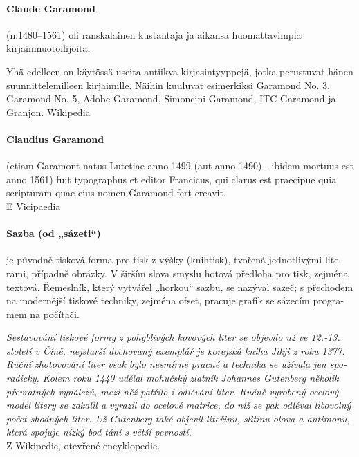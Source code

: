 \documentclass[pagesize,DIV14]{scrartcl}
\begin{document}
\begin{multicols}{2}
\begin{finnish}
\paragraph*{Claude Garamond} (n.1480–1561) oli ranskalainen kustantaja ja aikansa huomattavimpia kirjainmuotoilijoita.

Yhä edelleen on käytössä useita antiikva-kirjasintyyppejä, jotka perustuvat hänen suunnittelemilleen kirjaimille. Näihin kuuluvat esimerkiksi Garamond No. 3, Garamond No. 5, Adobe Garamond, Simoncini Garamond, ITC Garamond ja Granjon.
{\scriptsize Wikipedia}

\end{finnish}
\begin{latin} 
\paragraph*{Claudius Garamond} (etiam Garamont natus Lutetiae anno 1499 (aut anno 1490) - ibidem mortuus est anno 1561) fuit typographus et editor Francicus, qui clarus est praecipue quia scripturam quae eius nomen Garamond fert creavit.\\
{\scriptsize E Vicipaedia}
\end{latin}
\begin{czech}
\paragraph*{Sazba (od „sázeti“)} je původně tisková forma pro tisk z výšky (knihtisk), tvořená jednotlivými literami, případně obrázky. V širším slova smyslu hotová předloha pro tisk, zejména textová. Řemeslník, který vytvářel „horkou“ sazbu, se nazýval sazeč; s přechodem na modernější tiskové techniky, zejména ofset, pracuje grafik se sázecím programem na počítači.\par
\textit{Sestavování tiskové formy z pohyblivých kovových liter se objevilo už ve 12.-13. století v Číně, nejstarší dochovaný exemplář je korejská kniha Jikji z roku 1377. Ruční zhotovování liter však bylo nesmírně pracné a technika se užívala jen sporadicky. Kolem roku 1440 udělal mohučský zlatník Johannes Gutenberg několik převratných vynálezů, mezi něž patřilo i odlévání liter. Ručně vyrobený ocelový model litery se zakalil a vyrazil do ocelové matrice, do níž se pak odléval libovolný počet shodných liter. Už Gutenberg také objevil liteřinu, slitinu olova a antimonu, která spojuje nízký bod tání s větší pevností.}\\
{\scriptsize Z Wikipedie, otevřené encyklopedie.}
\end{czech}
\begin{polish}

\end{polish}
\end{multicols}
\end{document}
